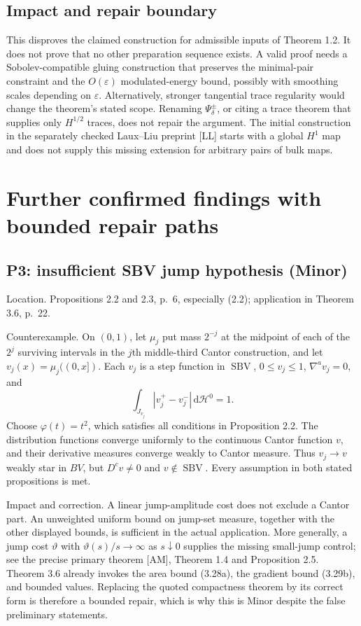 \documentclass[10pt]{article}
\begin{document}
\subsection*{Impact and repair boundary}
This disproves the claimed construction for admissible inputs of Theorem 1.2. It does not prove that no other preparation sequence exists. A valid proof needs a Sobolev-compatible gluing construction that preserves the minimal-pair constraint and the \(O(\varepsilon)\) modulated-energy bound, possibly with smoothing scales depending on \(\varepsilon\). Alternatively, stronger tangential trace regularity would change the theorem’s stated scope. Renaming \(\Psi_\delta^\pm\), or citing a trace theorem that supplies only \(H^{1/2}\) traces, does not repair the argument. The initial construction in the separately checked Laux–Liu preprint [LL] starts with a global \(H^1\) map and does not supply this missing extension for arbitrary pairs of bulk maps.\par
\section*{Further confirmed findings with bounded repair paths}
\subsection*{P3: insufficient SBV jump hypothesis (Minor)}
Location. Propositions 2.2 and 2.3, p. 6, especially (2.2); application in Theorem 3.6, p. 22.\par
Counterexample. On \((0,1)\), let \(\mu_j\) put mass \(2^{-j}\) at the midpoint of each of the \(2^j\) surviving intervals in the \(j\)th middle-third Cantor construction, and let \(v_j(x)=\mu_j((0,x])\). Each \(v_j\) is a step function in \(\operatorname{SBV}\), \(0\leq v_j\leq1\), \(\nabla^a v_j=0\), and \[\int_{J_{v_j}}|v_j^+-v_j^-|\,\mathrm d\mathcal H^0=1.\] Choose \(\varphi(t)=t^2\), which satisfies all conditions in Proposition 2.2. The distribution functions converge uniformly to the continuous Cantor function \(v\), and their derivative measures converge weakly to Cantor measure. Thus \(v_j\to v\) weakly star in \(BV\), but \(D^cv\neq0\) and \(v\notin\operatorname{SBV}\). Every assumption in both stated propositions is met.\par
Impact and correction. A linear jump-amplitude cost does not exclude a Cantor part. An unweighted uniform bound on jump-set measure, together with the other displayed bounds, is sufficient in the actual application. More generally, a jump cost \(\vartheta\) with \(\vartheta(s)/s\to\infty\) as \(s\downarrow0\) supplies the missing small-jump control; see the precise primary theorem [AM], Theorem 1.4 and Proposition 2.5. Theorem 3.6 already invokes the area bound (3.28a), the gradient bound (3.29b), and bounded values. Replacing the quoted compactness theorem by its correct form is therefore a bounded repair, which is why this is Minor despite the false preliminary statements.\par
\end{document}
